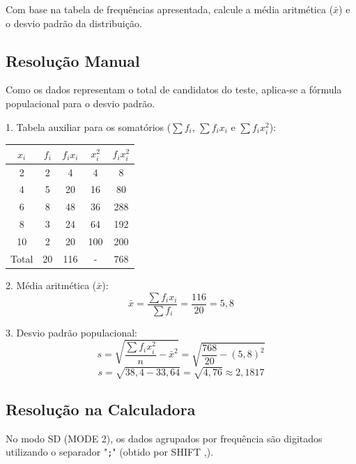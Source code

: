 Com base na tabela de frequências apresentada, calcule a média aritmética ($\bar{x}$) e o desvio padrão da distribuição.

\subsection*{Resolução Manual}

Como os dados representam o total de candidatos do teste, aplica-se a fórmula populacional para o desvio padrão.

1. Tabela auxiliar para os somatórios ($\sum f_i$, $\sum f_i x_i$ e $\sum f_i x_i^2$):

\begin{table}[H]
    \centering
    \begin{tabular}{|c|c|c|c|c|}
        \hline
        $x_i$ & $f_i$ & $f_i x_i$ & $x_i^2$ & $f_i x_i^2$ \\ \hline
        2  & 2  & 4   & 4   & 8   \\
        4  & 5  & 20  & 16  & 80  \\
        6  & 8  & 48  & 36  & 288 \\
        8  & 3  & 24  & 64  & 192 \\
        10 & 2  & 20  & 100 & 200 \\ \hline
        Total & 20 & 116 & - & 768 \\ \hline
    \end{tabular}
\end{table}

2. Média aritmética ($\bar{x}$):
\[
\bar{x} = \frac{\sum f_i x_i}{\sum f_i} = \frac{116}{20} = 5{,}8
\]

3. Desvio padrão populacional:
\[
s = \sqrt{\frac{\sum f_i x_i^2}{n} - \bar{x}^2} = \sqrt{\frac{768}{20} - (5{,}8)^2}
\]
\[
s= \sqrt{38{,}4 - 33{,}64} = \sqrt{4{,}76} \approx 2{,}1817
\]

\subsection*{Resolução na Calculadora}

No modo SD (MODE 2), os dados agrupados por frequência são digitados utilizando o separador "\texttt{;}" (obtido por SHIFT ,).

